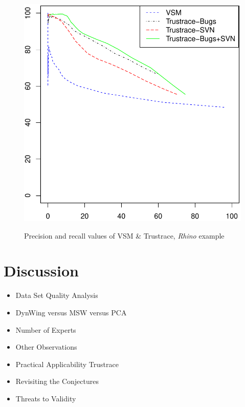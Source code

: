 \documentclass[12pt,hyperref=true,mathserif]{beamer}
\begin{document}
\begin{frame}
\begin{figure}
  \centering
  \includegraphics[scale=0.5]{vsm_rhino_2exp_example}\\
  \caption{Precision and recall values of VSM \& Trustrace, \textit{Rhino} example}\label{fig:VSMRhino}
\end{figure}
\end{frame}

\section{Discussion}
\begin{frame}
\begin{itemize}
  \item Data Set Quality Analysis\\[4pt]
  \item DynWing versus MSW versus PCA\\[4pt]
  \item Number of Experts\\[4pt]
  \item Other Observations\\[4pt]
  \item Practical Applicability Trustrace\\[4pt]
  \item Revisiting the Conjectures\\[4pt]
  \item Threats to Validity\\[4pt]
\end{itemize}
\end{frame}
\end{document}
